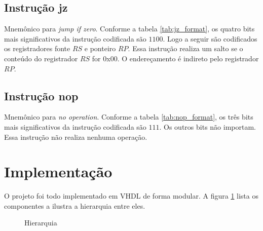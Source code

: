 \documentclass[a4paper, 12pt]{article}
\begin{document}
\subsection{Instrução jz}
\begin{table}[ht]
	\centering
	\caption{Formato da instrução codificada \textit{jz}}
	\label{tab:jz_format}
\end{table}


Mnemônico para \textit{jump if zero}. Conforme a tabela \ref{tab:jz_format}, os 
quatro bits mais significativos da instrução codificada são $1100$. 
Logo a seguir são codificados os registradores fonte $RS$ e ponteiro $RP$.
Essa instrução realiza um salto se o conteúdo do registrador $RS$ for 0x00.
O endereçamento é indireto pelo registrador $RP$.

\subsection{Instrução nop}
\begin{table}[ht]
	\centering
	\caption{Formato da instrução codificada \textit{nop}}
	\label{tab:nop_format}
\end{table}


Mnemônico para \textit{no operation}. Conforme a tabela \ref{tab:nop_format}, os 
três bits mais significativos da instrução codificada são $111$. Os outros bits não importam.
Essa instrução não realiza nenhuma operação.

\section{Implementação}

O projeto foi todo implementado em VHDL de forma modular.
A figura \ref{fig:hierarquia} lista os componentes a ilustra a hierarquia entre eles.

\begin{figure}[ht]
	\centering
    \def\svgwidth{\columnwidth}
    
	\caption{Hierarquia}
	\label{fig:hierarquia}
\end{figure}
\end{document}
